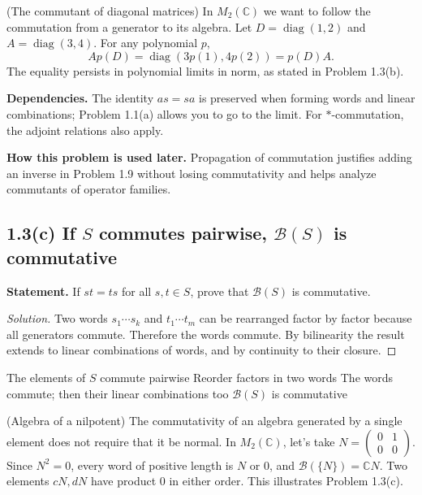 \begin{cthejemplo}{(The commutant of diagonal matrices)}
In $M_2(\mathbb C)$ we want to follow the commutation from a generator to its algebra.
Let $D=\operatorname{diag}(1,2)$ and $A=\operatorname{diag}(3,4)$.
For any polynomial $p$,
\[
 Ap(D)=\operatorname{diag}(3p(1),4p(2))=p(D)A.
\]
The equality persists in polynomial limits in norm, as stated in Problem 1.3(b).
\end{cthejemplo}

\noindent\textbf{Dependencies.} The identity $as=sa$ is preserved when forming words and linear combinations; Problem 1.1(a) allows you to go to the limit. For $*$-commutation, the adjoint relations also apply.

\noindent\textbf{How this problem is used later.} Propagation of commutation justifies adding an inverse in Problem 1.9 without losing commutativity and helps analyze commutants of operator families.

\subsection*{1.3(c) If $S$ commutes pairwise, $\mathcal B(S)$ is commutative}

\noindent\textbf{Statement.} If $st=ts$ for all $s,t\in S$, prove that $\mathcal B(S)$ is commutative.

\begin{proof}[Solution]
Two words $s_1\cdots s_k$ and $t_1\cdots t_m$ can be rearranged factor by factor because all
generators commute. Therefore the words commute. By bilinearity the result extends to linear combinations of words, and by continuity to their closure.
\end{proof}

\proofdiagram
{The elements of $S$ commute pairwise}
{Reorder factors in two words}
{The words commute; then their linear combinations too}
{$\mathcal B(S)$ is commutative}

\begin{cthejemplo}{(Algebra of a nilpotent)}
The commutativity of an algebra generated by a single element does not require that it be normal.
In $M_2(\mathbb C)$, let's take $N=\begin{pmatrix}0&1\\0&0\end{pmatrix}$.
Since $N^2=0$, every word of positive length is $N$ or $0$, and
$\mathcal B(\{N\})=\mathbb C N$.
Two elements $cN,dN$ have product $0$ in either order. This illustrates Problem 1.3(c).
\end{cthejemplo}

